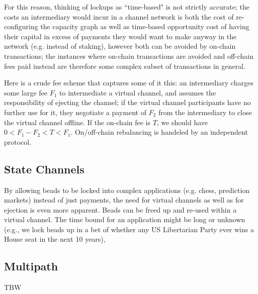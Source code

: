 \documentclass{article}
\begin{document}
\begin{figure}[H]
    \centering
\end{figure}

For this reason, thinking of lockups as ``time-based" is not strictly accurate; the costs an intermediary would incur in a channel network is both the cost of re-configuring the capacity graph as well as time-based opportunity cost of having their capital in excess of payments they would want to make anyway in the network (e.g. instead of staking), however both can be avoided by on-chain transactions; the instances where on-chain transactions are avoided and off-chain fees paid instead are therefore some complex subset of transactions in general.

Here is a crude fee scheme that captures some of it this: an intermediary charges some large fee $F_1$ to intermediate a virtual channel, and assumes the responsibility of ejecting the channel; if the virtual channel participants have no further use for it, they negotiate a payment of $F_2$ from the intermediary to close the virtual channel offline. If the on-chain fee is $T$, we should have $0 < F_1 - F_2 < T < F_1$. On/off-chain rebalancing is handeled by an independent protocol.

\subsection*{State Channels}

By allowing beads to be locked into complex applications (e.g. chess, prediction markets) instead of just payments, the need for virtual channels as well as for ejection is even more apparent. Beads can be freed up and re-used within a virtual channel. The time bound for an application might be long or unknown (e.g., we lock beads up in a bet of whether any US Libertarian Party ever wins a House seat in the next 10 years),

\subsection*{Multipath}

TBW
\end{document}
